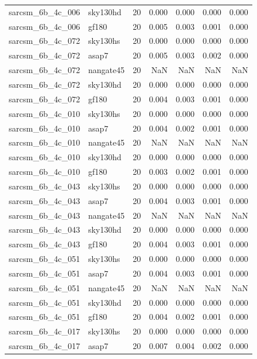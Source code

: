 \begin{tabular}{llrrrrr}
sarcsm\_6b\_4c\_006 & sky130hd & 20 & 0.000 & 0.000 & 0.000 & 0.000 \\
sarcsm\_6b\_4c\_006 & gf180 & 20 & 0.005 & 0.003 & 0.001 & 0.000 \\
sarcsm\_6b\_4c\_072 & sky130hs & 20 & 0.000 & 0.000 & 0.000 & 0.000 \\
sarcsm\_6b\_4c\_072 & asap7 & 20 & 0.005 & 0.003 & 0.002 & 0.000 \\
sarcsm\_6b\_4c\_072 & nangate45 & 20 & NaN & NaN & NaN & NaN \\
sarcsm\_6b\_4c\_072 & sky130hd & 20 & 0.000 & 0.000 & 0.000 & 0.000 \\
sarcsm\_6b\_4c\_072 & gf180 & 20 & 0.004 & 0.003 & 0.001 & 0.000 \\
sarcsm\_6b\_4c\_010 & sky130hs & 20 & 0.000 & 0.000 & 0.000 & 0.000 \\
sarcsm\_6b\_4c\_010 & asap7 & 20 & 0.004 & 0.002 & 0.001 & 0.000 \\
sarcsm\_6b\_4c\_010 & nangate45 & 20 & NaN & NaN & NaN & NaN \\
sarcsm\_6b\_4c\_010 & sky130hd & 20 & 0.000 & 0.000 & 0.000 & 0.000 \\
sarcsm\_6b\_4c\_010 & gf180 & 20 & 0.003 & 0.002 & 0.001 & 0.000 \\
sarcsm\_6b\_4c\_043 & sky130hs & 20 & 0.000 & 0.000 & 0.000 & 0.000 \\
sarcsm\_6b\_4c\_043 & asap7 & 20 & 0.004 & 0.003 & 0.001 & 0.000 \\
sarcsm\_6b\_4c\_043 & nangate45 & 20 & NaN & NaN & NaN & NaN \\
sarcsm\_6b\_4c\_043 & sky130hd & 20 & 0.000 & 0.000 & 0.000 & 0.000 \\
sarcsm\_6b\_4c\_043 & gf180 & 20 & 0.004 & 0.003 & 0.001 & 0.000 \\
sarcsm\_6b\_4c\_051 & sky130hs & 20 & 0.000 & 0.000 & 0.000 & 0.000 \\
sarcsm\_6b\_4c\_051 & asap7 & 20 & 0.004 & 0.003 & 0.001 & 0.000 \\
sarcsm\_6b\_4c\_051 & nangate45 & 20 & NaN & NaN & NaN & NaN \\
sarcsm\_6b\_4c\_051 & sky130hd & 20 & 0.000 & 0.000 & 0.000 & 0.000 \\
sarcsm\_6b\_4c\_051 & gf180 & 20 & 0.004 & 0.002 & 0.001 & 0.000 \\
sarcsm\_6b\_4c\_017 & sky130hs & 20 & 0.000 & 0.000 & 0.000 & 0.000 \\
sarcsm\_6b\_4c\_017 & asap7 & 20 & 0.007 & 0.004 & 0.002 & 0.000 \\

\end{tabular}
